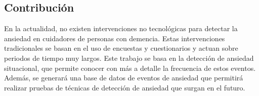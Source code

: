 \subsection{Contribuci\'on}
	En la actualidad, no existen intervenciones no tecnol\'ogicas para detectar la ansiedad en cuidadores de personas con demencia. Estas intervenciones tradicionales se basan en el uso de encuestas y cuestionarios y actuan sobre periodos de tiempo muy largos. Este trabajo se basa en la detecci\'on de ansiedad situacional, que permite conocer con m\'as a detalle la frecuencia de estos eventos.
	Adem\'as, se generar\'a una base de datos de eventos de ansiedad que permitir\'a realizar pruebas de t\'ecnicas de detecci\'on de ansiedad que surgan en el futuro.


	
